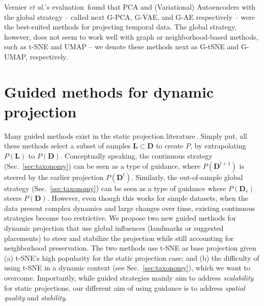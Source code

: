 Vernier \emph{et al.}'s evaluation\,\cite{Vernier2020} found that PCA and (Variational) Autoencoders with the global strategy -- called next G-PCA, G-VAE, and G-AE respectively -- were the best-suited methods for projecting temporal data. The global strategy, however, does not seem to work well with graph or neighborhood-based methods, such as t-SNE and UMAP -- we denote these methods next as G-tSNE and G-UMAP, respectively. 

\section{Guided methods for dynamic projection}
\label{sec:methods}
%
Many guided methods exist in the static projection literature\,\cite{Nonato2019,sorzano14_survey}. Simply put, all these methods select a subset of samples $\mathbf{L} \subset \mathbf{D}$ to create $P$, by extrapolating $P(\mathbf{L})$ to $P(\mathbf{D})$. Conceptually speaking, the continuous strategy (Sec.~\ref{sec:taxonomy}) can be seen as a type of guidance, where $P(\mathbf{D}^{t+1})$ is steered by the earlier projection $P(\mathbf{D}^{t})$. Similarly, the out-of-sample global strategy (Sec.~\ref{sec:taxonomy}) can be seen as a type of guidance where $P(\mathbf{D}_s)$ steers $P(\mathbf{D})$. However, even though this works for simple datasets, when the data present complex dynamics and large changes over time, existing continuous strategies become too restrictive. We propose two new guided methods for dynamic projection that use global influences (landmarks or suggested placements) to steer and stabilize the projection while still accounting for neighborhood preservation. The two methods use t-SNE as base projection given (a) t-SNE's high popularity for the static projection case; and (b) the difficulty of using t-SNE in a dynamic context (see Sec.~\ref{sec:taxonomy}), which we want to overcome.
Importantly, while guided strategies mainly aim to address \emph{scalability} for static projections, our different aim of using guidance is to address \emph{spatial quality} and \emph{stability}. 

